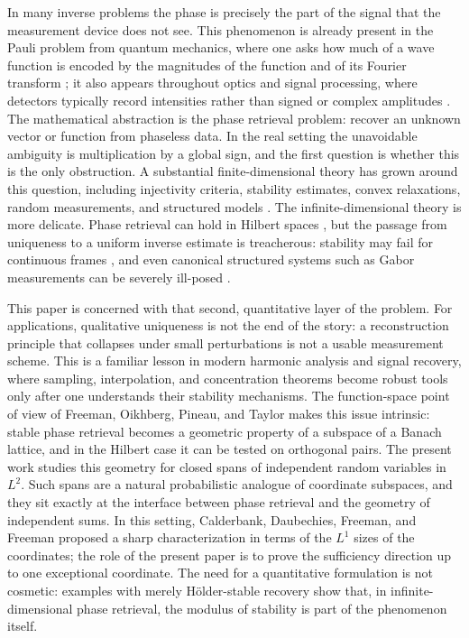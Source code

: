 
In many inverse problems the phase is precisely the part of the signal that the
measurement device does not see.  This phenomenon is already present in the
Pauli problem from quantum mechanics, where one asks how much of a wave function
is encoded by the magnitudes of the function and of its Fourier transform
\cite{pauli1933allgemeinen,ramos-sousa-pauli}; it also appears throughout
optics and signal processing, where detectors typically record intensities
rather than signed or complex amplitudes
\cite{sanz1984phase,MR3069958,eldar2014stability,grohs2020survey}.  The
mathematical abstraction is the phase retrieval problem: recover an unknown
vector or function from phaseless data.  In the real setting the unavoidable
ambiguity is multiplication by a global sign, and the first question is whether
this is the only obstruction.  A substantial finite-dimensional theory has
grown around this question, including injectivity criteria, stability
estimates, convex relaxations, random measurements, and structured models
\cite{bandeira2014saving,balan2013,MR3069958,MR3260258,KS,DB,MR3746047}.
The infinite-dimensional theory is more delicate.  Phase retrieval can hold in
Hilbert spaces \cite{cahill2016infinite}, but the passage from uniqueness to a
uniform inverse estimate is treacherous: stability may fail for continuous
frames \cite{alaifari2017continuous}, and even canonical structured systems
such as Gabor measurements can be severely ill-posed
\cite{alaifari2021gabor,grohs2021stable,grohs20212,steinerberger2020stability}.

This paper is concerned with that second, quantitative layer of the problem.
For applications, qualitative uniqueness is not the end of the story: a
reconstruction principle that collapses under small perturbations is not a
usable measurement scheme.  This is a familiar lesson in modern harmonic
analysis and signal recovery, where sampling, interpolation, and concentration
theorems become robust tools only after one understands their stability
mechanisms.  The function-space point of view of Freeman, Oikhberg, Pineau, and
Taylor \cite{FOTP} makes this issue intrinsic: stable phase retrieval becomes a
geometric property of a subspace of a Banach lattice, and in the Hilbert case it
can be tested on orthogonal pairs.  The present work studies this geometry for
closed spans of independent random variables in $L^2$.  Such spans are a
natural probabilistic analogue of coordinate subspaces, and they sit exactly at
the interface between phase retrieval and the geometry of independent sums.  In
this setting, Calderbank, Daubechies, Freeman, and Freeman
\cite{calderbank2022stable} proposed a sharp characterization in terms of the
$L^1$ sizes of the coordinates; the role of the present paper is to prove the
sufficiency direction up to one exceptional coordinate.  The need for a
quantitative formulation is not cosmetic: examples with merely
H\"older-stable recovery \cite{christ2022examples} show that, in
infinite-dimensional phase retrieval, the modulus of stability is part of the
phenomenon itself.
